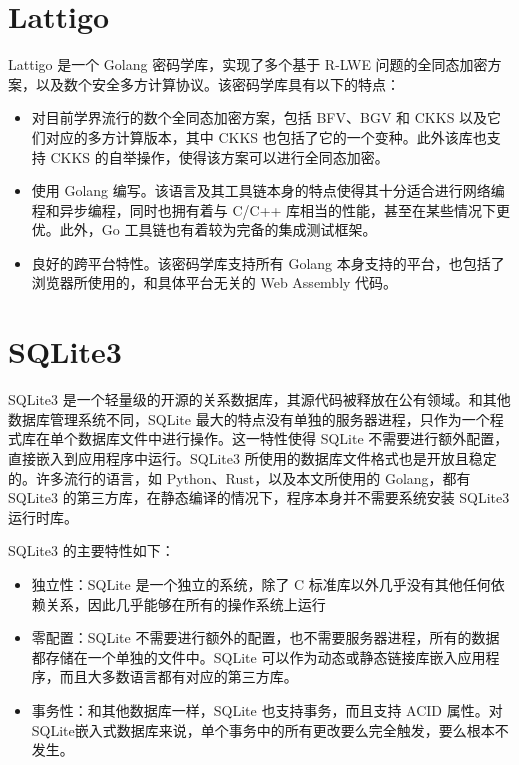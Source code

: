\section{Lattigo}

Lattigo 是一个 Golang 密码学库，实现了多个基于 R-LWE 问题的全同态加密方案，以及数个安全多方计算协议。\cite{Mouchet2020LattigoAM,lattigoRepo}该密码学库具有以下的特点：

\begin{itemize}
    \item 对目前学界流行的数个全同态加密方案，包括 BFV、BGV 和 CKKS 以及它们对应的多方计算版本，其中 CKKS 也包括了它的一个变种\cite{cryptoeprint:2018/952}。此外该库也支持 CKKS 的自举操作，使得该方案可以进行全同态加密。
    \item 使用 Golang 编写。该语言及其工具链本身的特点使得其十分适合进行网络编程和异步编程，同时也拥有着与 C/C++ 库相当的性能，甚至在某些情况下更优。此外，Go 工具链也有着较为完备的集成测试框架。
    \item 良好的跨平台特性。该密码学库支持所有 Golang 本身支持的平台，也包括了浏览器所使用的，和具体平台无关的 Web Assembly 代码。
\end{itemize}

\section{SQLite3}

SQLite3 是一个轻量级的开源的关系数据库，其源代码被释放在公有领域\cite{sqlite3}。和其他数据库管理系统不同，SQLite 最大的特点没有单独的服务器进程，只作为一个程式库在单个数据库文件中进行操作。这一特性使得 SQLite 不需要进行额外配置，直接嵌入到应用程序中运行。SQLite3 所使用的数据库文件格式也是开放且稳定的。许多流行的语言，如 Python、Rust，以及本文所使用的 Golang，都有 SQLite3 的第三方库，在静态编译的情况下，程序本身并不需要系统安装 SQLite3 运行时库。

SQLite3 的主要特性如下：\cite{sqlite3_2}

\begin{itemize}
    \item 独立性：SQLite 是一个独立的系统，除了 C 标准库以外几乎没有其他任何依赖关系，因此几乎能够在所有的操作系统上运行
    \item 零配置：SQLite 不需要进行额外的配置，也不需要服务器进程，所有的数据都存储在一个单独的文件中。SQLite 可以作为动态或静态链接库嵌入应用程序，而且大多数语言都有对应的第三方库。
    \item 事务性：和其他数据库一样，SQLite 也支持事务，而且支持 ACID 属性。对SQLite嵌入式数据库来说，单个事务中的所有更改要么完全触发，要么根本不发生。
\end{itemize}

